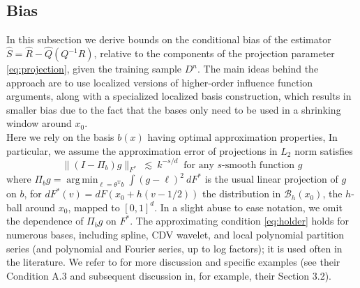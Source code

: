 \documentclass[11pt,twoside]{article}
\def\T{{ \mathrm{\scriptscriptstyle T} }}
\newcommand{\Holder}{\text{H\"{o}lder}}
\DeclareMathOperator*{\argmin}{arg\,min}
\theoremstyle{definition}
\theoremstyle{remark}
\begin{document}
\subsection{Bias}
\label{sec:bias}

In this subsection we derive bounds on  the conditional bias of the estimator $\widehat{S}=\widehat{R}-\widehat{Q} (Q^{-1}R)$, relative to the components of the projection parameter \eqref{eq:projection}, given the training sample $D^n$. The main ideas behind the approach are to use localized versions of higher-order influence function arguments,   along with a specialized localized basis construction, which results in smaller bias due to the fact that the bases only need to be used  in a shrinking window around $x_0$.  \\

Here we rely on the basis $b(x)$ having  
optimal \Holder{} approximation properties, In particular, we assume the approximation error of projections in $L_2$ norm satisfies
\begin{equation} \label{eq:holder}
\| (I-\Pi_b) g \|_{F^*} \ \lesssim \ k^{-s/d}  \ \text{ for any $s$-smooth function $g$}
 \end{equation}
where $\Pi_b g = \argmin_{\ell=\theta^\T b} \int (g - \ell)^2 \ dF^*$ is the usual linear projection of $g$ on $b$, 
for $dF^*(v)=dF(x_0 + h(v-1/2))$ the distribution in  $\mathcal{B}_h(x_0)$, the $h$-ball around $x_0$,  mapped to $[0,1]^d$. 
In a slight abuse to ease notation, we omit the dependence of $\Pi_b g$ on $F^*$.
The approximating condition \eqref{eq:holder} holds for numerous bases, including spline, CDV wavelet, and local polynomial partition series (and polynomial and Fourier series, up to log factors); it is used often in the literature. We refer to \citet{belloni2015some} for more discussion and specific examples (see their Condition A.3 and subsequent discussion in, for example, their Section 3.2). \\
\end{document}
